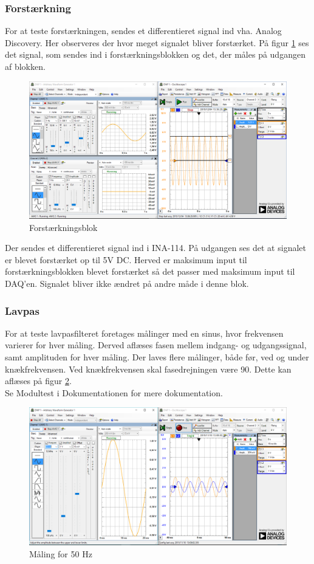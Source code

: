 \subsubsection{Forstærkning}
For at teste forstærkningen, sendes et differentieret signal ind vha. Analog Discovery. Her observeres der hvor meget signalet bliver forstærket. 
På figur \ref{fig:forstaerkning} ses det signal, som sendes ind i forstærkningsblokken og det, der måles på udgangen af blokken. 
\begin{figure}[H]
	\centering
	\includegraphics[width=1.0\textwidth]{Figurer/forst_blok}
	\caption{Forstærkningsblok}
	\label{fig:forstaerkning}
\end{figure}
Der sendes et differentieret signal ind i INA-114. På udgangen ses det at signalet er blevet forstærket op til 5V DC. Herved er maksimum input til forstærkningsblokken blevet forstærket så det passer med maksimum input til DAQ'en. Signalet bliver ikke ændret på andre måde i denne blok.

\subsubsection{Lavpas}
For at teste lavpasfilteret foretages målinger med en sinus, hvor frekvensen varierer for hver måling. Derved aflæses fasen mellem indgang- og udgangssignal, samt amplituden for hver måling. Der laves flere målinger, både før, ved og under knækfrekvensen. 
Ved knækfrekvensen skal fasedrejningen være 90\textdegree. Dette kan aflæses på figur \ref{fig:maeling50Hz}.\\
Se Modultest i Dokumentationen for mere dokumentation.  
\begin{figure}[H]
	\centering
	\includegraphics[width=1.0\textwidth]{Figurer/50Hz}
	\caption{Måling for 50 Hz}
	\label{fig:maeling50Hz}
\end{figure}


